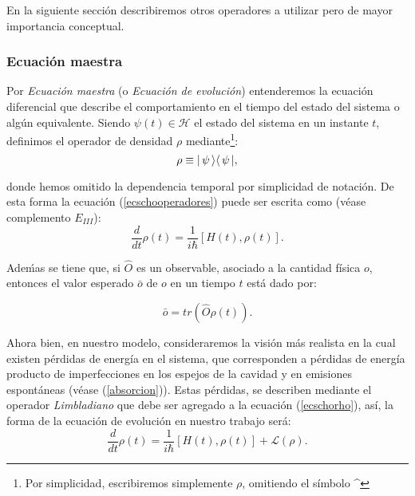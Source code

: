 En la siguiente secci\'on describiremos otros operadores a utilizar pero de mayor importancia conceptual.

\subsubsection{Ecuaci\'on maestra}\label{ecuacionmaestra}
\quad Por \emph{Ecuaci\'on maestra} (o \emph{Ecuaci\'on de evoluci\'on}) entenderemos la ecuaci\'on diferencial que describe el comportamiento en el tiempo del estado del sistema o alg\'un equivalente. Siendo $\psi(t)\in \mathcal{H}$ el estado del sistema en un instante $t$, definimos el operador de densidad $\rho$ mediante\footnote{Por simplicidad, escribiremos simplemente $\rho$, omitiendo el s\'imbolo \textasciicircum }:
\begin{equation}
 \rho\equiv\vert\, \psi \,\rangle\langle\, \psi \,\vert,\label{operadordensidad}
\end{equation}

donde hemos omitido la dependencia temporal por simplicidad de notaci\'on. De esta forma la ecuaci\'on (\ref{ecschooperadores}) puede ser escrita como (v\'ease \cite{cohen} complemento $E_{III}$): 
\begin{equation}
\frac{d}{dt}\rho(t)= \frac{1}{i\hbar}\left[H(t),\rho(t)\right].\label{ecschorho}
\end{equation}

\quad Ade\'mas se tiene que, si $\hat{O}$ es un observable, asociado a la cantidad f\'isica $o$, entonces el valor esperado $\bar{o}$ de $o$ en un tiempo $t$ est\'a dado por:

\begin{equation}
 \bar{o}=tr\left(\hat{O}\rho(t)\right).\label{ec:traza_opRho}
\end{equation}


\quad Ahora bien, en nuestro modelo, consideraremos la visi\'on m\'as realista en la cual existen p\'erdidas de energ\'ia en el sistema, que corresponden a p\'erdidas de energ\'ia producto de imperfecciones en los espejos de la cavidad y en emisiones espont\'aneas (v\'ease (\ref{absorcion})). Estas p\'erdidas, se describen mediante el operador \emph{Limbladiano} que debe ser agregado a la ecuaci\'on (\ref{ecschorho}), as\'i, la forma de la ecuaci\'on de evoluci\'on en nuestro trabajo ser\'a:
\begin{equation}
\frac{d}{dt}\rho(t)= \frac{1}{i\hbar}\left[H(t),\rho(t)\right]+\mathcal{L}(\rho).\label{ecschorholimb}
\end{equation}

